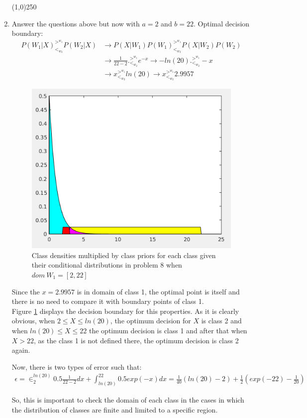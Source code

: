 \documentclass[12pt]{article}
\newcommand{\gl}{^{>^{w_1}}_{<_{w_2}}}
\begin{document}
\begin{enumerate}
\begin{center}
\line(1,0){250}
\end{center}

\item Answer the questions above but now with $a = 2$ and $b = 22$.
Optimal decision boundary:
\begin{align*}
P(W_1|X)\gl P(W_2|X) &\rightarrow  P(X|W_1)P(W_1)\gl P(X|W_2)P(W_2) \\
&\rightarrow \frac{1}{22 - 2} .\gl e^{-x} \rightarrow -ln(20) .\gl -x \\
&\rightarrow x\gl ln(20) \rightarrow x\gl 2.9957
\end{align*}
\begin{figure}[h]
\centering
\includegraphics[scale=0.5]{Imgs/8-2.png}
\caption{Class densities multiplied by class priors for each class given their conditional distributions in problem 8 when $dom \> W_1 = [2,22]$}
\label{fig:8-2}
\end{figure}

Since the $x = 2.9957$ is in domain of class 1, the optimal point is itself and there is no need to compare it with boundary points of class 1. \\
Figure \ref{fig:8-2} displays the decision boundary for this properties. As it is clearly obvious, when $2 \leq X \leq ln(20)$, the optimum decision for $X$ is class 2 and when $ln(20) \leq X \leq 22$ the optimum decision is class 1 and after that when $X > 22$, as the class 1 is not defined there, the optimum decision is class 2 again.

Now, there is two types of error such that:
\begin{align*}
\epsilon = \in_2^{ln(20)} 0.5\frac{1}{22-2} dx + \int_{ln(20)}^22 0.5 exp(-x) dx = \frac{1}{40}(ln(20) - 2) + \frac{1}{2}(exp(-22) - \frac{1}{20})
\end{align*}

So, this is important to check the domain of each class in the cases in which the distribution of classes are finite and limited to a specific region. 

\end{enumerate}
\end{document}
